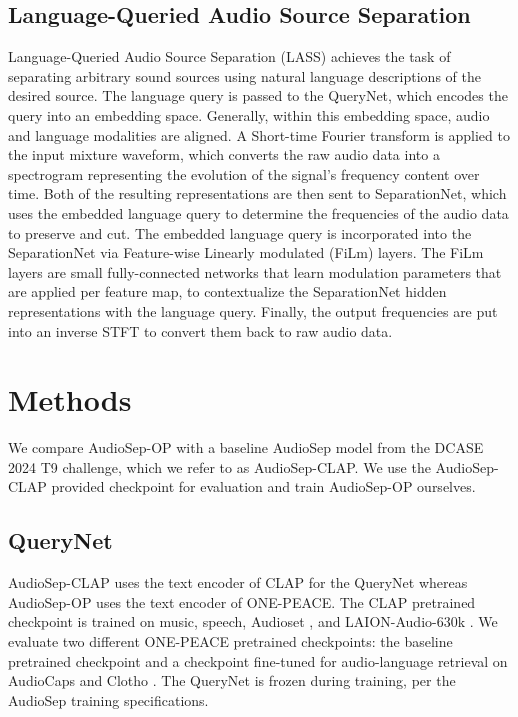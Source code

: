 \documentclass[11pt]{article}
\begin{document}
\subsection{Language-Queried Audio Source Separation}
Language-Queried Audio Source Separation (LASS) \cite{lass} achieves the task of separating arbitrary sound sources using natural language descriptions of the desired source. The language query is passed to the QueryNet, which encodes the query into an embedding space. Generally, within this embedding space, audio and language modalities are aligned. A Short-time Fourier transform is applied to the input mixture waveform, which converts the raw audio data into a spectrogram representing the evolution of the signal’s frequency content over time. Both of the resulting representations are then sent to SeparationNet, which uses the embedded language query to determine the frequencies of the audio data to preserve and cut. The embedded language query is incorporated into the SeparationNet via Feature-wise Linearly modulated (FiLm) layers. The FiLm layers are small fully-connected networks that learn modulation parameters that are applied per feature map, to contextualize the SeparationNet hidden representations with the language query. Finally, the output frequencies are put into an inverse STFT to convert them back to raw audio data. 


\section{Methods}
We compare AudioSep-OP with a baseline AudioSep model from the DCASE 2024 T9 challenge,  which we refer to as AudioSep-CLAP. We use the AudioSep-CLAP provided checkpoint for evaluation and train AudioSep-OP ourselves.

\subsection{QueryNet}
AudioSep-CLAP uses the text encoder of CLAP for the QueryNet whereas AudioSep-OP uses the text encoder of ONE-PEACE. The CLAP pretrained checkpoint is trained on music, speech, Audioset \cite{audioset}, and LAION-Audio-630k \cite{clap}. We evaluate two different ONE-PEACE pretrained checkpoints: the baseline pretrained checkpoint and a checkpoint fine-tuned for audio-language retrieval on AudioCaps \cite{audiocaps} and Clotho \cite{clotho}. The QueryNet is frozen during training, per the AudioSep training specifications. 
\end{document}

